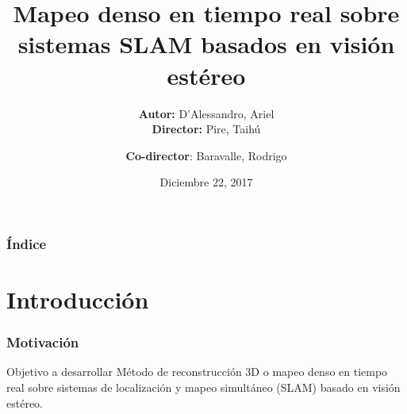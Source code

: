 \documentclass[compress]{beamer}
\author{\textbf{Autor:} D'Alessandro, Ariel \\ \textbf{Director:} Pire, Taihú \and \textbf{Co-director}: Baravalle, Rodrigo}
\title{Mapeo denso en tiempo real sobre sistemas SLAM basados en visión estéreo}
\institute{FCEIA - UNR}
\date{\scriptsize{Diciembre 22, 2017}}
\begin{document}
\frame{\titlepage}

\begin{frame}
\frametitle{Índice}
\tableofcontents
\end{frame}


\section{Introducción}


\begin{frame}
\frametitle{Motivación}

\begin{block}{Objetivo a desarrollar}
Método de reconstrucción 3D o mapeo denso en tiempo real sobre sistemas de localización y mapeo simultáneo (SLAM) basado en visión estéreo.
\end{block}

\end{frame}
\end{document}

